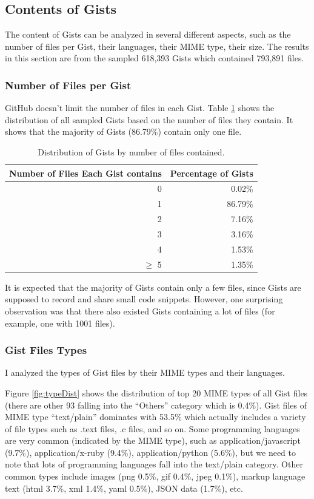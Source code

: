 \subsection{Contents of Gists}
The content of Gists can be analyzed in several different aspects, such as the number of files per Gist, their languages, their MIME type, their size. The results in this section are from the sampled 618,393 Gists which contained 793,891 files.

\subsubsection{Number of Files per Gist}

GitHub doesn't limit the number of files in each Gist. Table \ref{tb:files} shows the distribution of all sampled Gists based on the number of files they contain. It shows that the majority of Gists (86.79\%) contain only one file. 

\begin{table}[!htb]
 \begin{center}
 \begin{tabular}{@{}rr} 
    \textbf{Number of Files Each Gist contains}	&	\textbf{Percentage of Gists} \\ \hline
	0	&	0.02\%\\
	1	&	86.79\%\\
	2	&	7.16\%\\
	3	&	3.16\%\\
	4	&	1.53\%\\
	$\geq$ 5	&	1.35\%\\\hline
 \end{tabular}
 \end{center}
 \caption{Distribution of Gists by number of files contained.}
 \label{tb:files}
\end{table}

It is expected that the majority of Gists contain only a few files, since Gists are supposed to record and share small code snippets. However, one surprising observation was that there also existed Gists containing a lot of files (for example, one with 1001 files). 

\subsubsection{Gist Files Types}
I analyzed the types of Gist files by their MIME types and their languages.

Figure \ref{fig:typeDist} shows the distribution of top 20 MIME types of all Gist files (there are other 93 falling into the ``Others'' category which is 0.4\%). Gist files of MIME type ``text/plain'' dominates with 53.5\% which actually includes a variety of file types such as .text files, .c files, and so on. Some programming languages are very common (indicated by the MIME type), such as application/javascript (9.7\%), application/x-ruby (9.4\%), application/python (5.6\%), but we need to note that lots of programming languages fall into the text/plain category. Other common types include images (png 0.5\%, gif 0.4\%, jpeg 0.1\%), markup language text (html 3.7\%, xml 1.4\%, yaml 0.5\%), JSON data (1.7\%), etc. 

